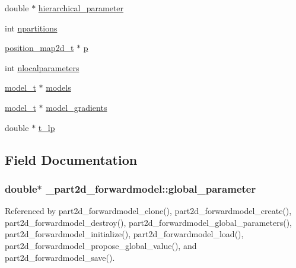 \begin{DoxyCompactItemize}
\item 
double $\ast$ \hyperlink{struct__part2d__forwardmodel_a3a3eac35072ac9cc0caa29e62f9935fe}{hierarchical\+\_\+parameter}
\item 
int \hyperlink{struct__part2d__forwardmodel_adf0f59d428b122c2b1937a33f56ddaa1}{npartitions}
\item 
\hyperlink{position__map2d_8h_a6d86d9b9f02238a497ecf2ebff2e1e39}{position\+\_\+map2d\+\_\+t} $\ast$ \hyperlink{struct__part2d__forwardmodel_a5e3868335795497eb056d912a0a07c12}{p}
\item 
int \hyperlink{struct__part2d__forwardmodel_ab8af84a58a93206e603d3dcbfa31625f}{nlocalparameters}
\item 
\hyperlink{part1d__forwardmodel_8c_a0a038e31b1f765296a40c2da07b46a84}{model\+\_\+t} $\ast$ \hyperlink{struct__part2d__forwardmodel_ab43f2fdabc222d4e674bc35e86e7e9b0}{models}
\item 
\hyperlink{part1d__forwardmodel_8c_a0a038e31b1f765296a40c2da07b46a84}{model\+\_\+t} $\ast$ \hyperlink{struct__part2d__forwardmodel_ad88ddfb2d4f6c66d47043b3ca4fa6f2c}{model\+\_\+gradients}
\item 
double $\ast$ \hyperlink{struct__part2d__forwardmodel_a8d34c3b23e939d1f446f239b1e47e2f0}{t\+\_\+lp}
\end{DoxyCompactItemize}


\subsection{Field Documentation}
\subsubsection[{\texorpdfstring{global\+\_\+parameter}{global_parameter}}]{\setlength{\rightskip}{0pt plus 5cm}double$\ast$ \+\_\+part2d\+\_\+forwardmodel\+::global\+\_\+parameter}\hypertarget{struct__part2d__forwardmodel_a1e733c2c95a579a0719709e06dd0b154}{}\label{struct__part2d__forwardmodel_a1e733c2c95a579a0719709e06dd0b154}


Referenced by part2d\+\_\+forwardmodel\+\_\+clone(), part2d\+\_\+forwardmodel\+\_\+create(), part2d\+\_\+forwardmodel\+\_\+destroy(), part2d\+\_\+forwardmodel\+\_\+global\+\_\+parameters(), part2d\+\_\+forwardmodel\+\_\+initialize(), part2d\+\_\+forwardmodel\+\_\+load(), part2d\+\_\+forwardmodel\+\_\+propose\+\_\+global\+\_\+value(), and part2d\+\_\+forwardmodel\+\_\+save().

